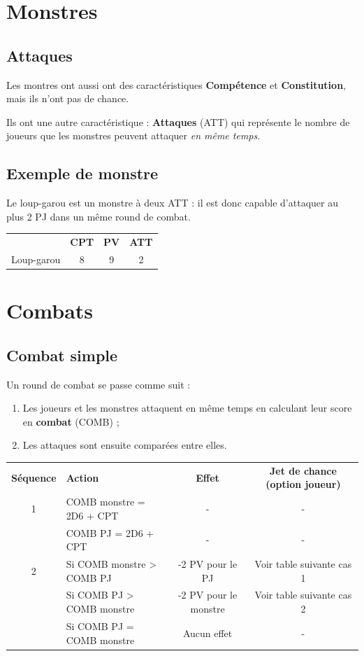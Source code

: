 \documentclass[a4paper, 11pt, twoside]{article}
\begin{document}
\section{Monstres}
\label{sec:org7f02d0d}

\subsection{Attaques}
\label{sec:orgb576cf5}

Les montres ont aussi ont des caractéristiques \textbf{Compétence} et \textbf{Constitution}, mais ils n'ont pas de chance.

Ils ont une autre caractéristique : \textbf{Attaques} (ATT) qui représente le nombre de joueurs que les monstres peuvent attaquer \emph{en même temps}.

\subsection{Exemple de monstre}
\label{sec:orgb5ab8ac}

Le loup-garou est un monstre à deux ATT : il est donc capable d'attaquer au plus 2 PJ dans un même round de combat.

\begin{longtable}{lccc}
 & \textbf{CPT} & \textbf{PV} & \textbf{ATT}\\
Loup-garou & 8 & 9 & 2\\
\end{longtable}

\section{Combats}
\label{sec:orga8189d4}

\subsection{Combat simple}
\label{sec:org2ab38ee}

Un round de combat se passe comme suit :
\begin{enumerate}
\item Les joueurs et les monstres attaquent en même temps en calculant leur score en \textbf{combat} (COMB) ;
\item Les attaques sont ensuite comparées entre elles.
\end{enumerate}

\begin{longtable}{clcc}
\textbf{Séquence} & \textbf{Action} & \textbf{Effet} & \textbf{Jet de chance (option joueur)}\\
1 & COMB monstre = 2D6 + CPT & - & -\\
 & COMB PJ = 2D6 + CPT & - & -\\
2 & Si COMB monstre > COMB PJ & -2 PV pour le PJ & Voir table suivante cas 1\\
 & Si COMB PJ > COMB monstre & -2 PV pour le monstre & Voir table suivante cas 2\\
 & Si COMB PJ = COMB monstre & Aucun effet & -\\
\end{longtable}
\end{document}
